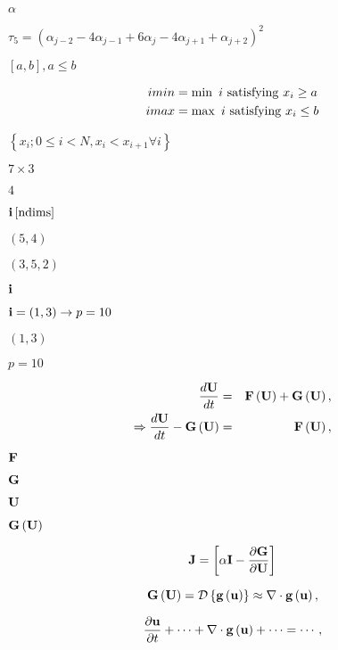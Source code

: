 \documentclass{article}
\begin{document}
$\alpha$
\pagebreak

$\tau_5 = \left( \alpha_{j-2}-4\alpha_{j-1}+6\alpha_j-4\alpha_{j+1}+\alpha_{j+2} \right)^2$
\pagebreak

$\left[a,b\right], a\leq b$
\pagebreak

\begin{align} imin &= \min\ i\ {\rm satisfying}\ x_i \geq a\\ imax &= \max\ i\ {\rm satisfying}\ x_i \leq b \end{align}
\pagebreak

$\left\{x_i; 0\leq i < N , x_i < x_{i+1} \forall i \right\}$
\pagebreak

$7 \times 3$
\pagebreak

$4$
\pagebreak

${\bf i}\left[{\rm ndims}\right]$
\pagebreak

$\left(5,4\right)$
\pagebreak

$\left(3,5,2\right)$
\pagebreak

${\bf i}$
\pagebreak

${\bf i} = \left(1,3\right) \rightarrow p = 10$
\pagebreak

$\left(1,3\right)$
\pagebreak

$p=10$
\pagebreak

\begin{eqnarray} \frac {d{\bf U}}{dt} &=& {\bf F}\left({\bf U}\right) + {\bf G}\left({\bf U}\right), \\ \Rightarrow \frac {d{\bf U}}{dt} - {\bf G}\left({\bf U}\right) &=& {\bf F}\left({\bf U}\right), \end{eqnarray}
\pagebreak

${\bf F}$
\pagebreak

${\bf G}$
\pagebreak

${\bf U}$
\pagebreak

${\bf G}\left({\bf U}\right)$
\pagebreak

\begin{equation} {\bf J} = \left[\alpha{\bf I} - \frac {\partial {\bf G}} {\partial {\bf U}} \right] \end{equation}
\pagebreak

\begin{equation} {\bf G}\left({\bf U}\right) = \mathcal{D}\left\{{\bf g}\left({\bf u}\right)\right\} \approx \nabla \cdot {\bf g}\left({\bf u}\right), \end{equation}
\pagebreak

\begin{equation} \frac {\partial {\bf u}} {\partial t} + \cdots + \nabla \cdot {\bf g}\left({\bf u}\right) + \cdots = \cdots, \end{equation}
\pagebreak
\end{document}
